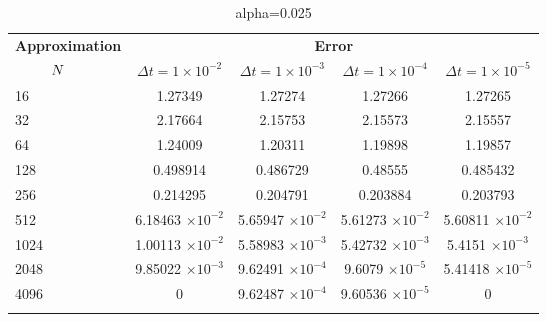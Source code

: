 	\begin{table}
		\begin{tabular}{lcccc}
			\toprule
			\multicolumn{1}{c}{\textbf{Approximation}} & \multicolumn{4}{c}{\textbf{Error}} \\
			$\hspace{9mm}N$ & $\Delta t=1\times 10^{-2}$ & $\Delta t=1\times 10^{-3}$ & $\Delta t=1\times 10^{-4}$ & $\Delta t=1\times 10^{-5}$ \\
			\midrule
			\hspace{7mm} 16 & 1.27349    & 1.27274     & 1.27266     & 1.27265     \\
			\midrule
			\hspace{7mm} 32 & 2.17664    & 2.15753     & 2.15573     & 2.15557     \\
			\midrule
			\hspace{7mm} 64 & 1.24009    & 1.20311     & 1.19898     & 1.19857     \\
			\midrule
			\hspace{7mm} 128 & 0.498914   & 0.486729    & 0.48555     & 0.485432    \\
			\midrule
			\hspace{7mm} 256 & 0.214295   & 0.204791    & 0.203884    & 0.203793    \\
			\midrule
			\hspace{7mm} 512 & 6.18463 $\times 10^{-2}$  & 5.65947 $\times 10^{-2}$   & 5.61273 $\times 10^{-2}$   & 5.60811 $\times 10^{-2}$   \\
			\midrule
			\hspace{7mm} 1024 & 1.00113 $\times 10^{-2}$  & 5.58983 $\times 10^{-3}$  & 5.42732 $\times 10^{-3}$  & 5.4151 $\times 10^{-3}$  \\
			\midrule
			\hspace{7mm} 2048 & 9.85022 $\times 10^{-3}$ & 9.62491 $\times 10^{-4}$ & 9.6079 $\times 10^{-5}$  & 5.41418 $\times 10^{-5}$ \\
			\midrule
			\hspace{7mm} 4096 & 0          & 9.62487 $\times 10^{-4}$ & 9.60536 $\times 10^{-5}$ & 0           \\
			\\
			\bottomrule
		\end{tabular}
		\caption{alpha=0.025}
	\end{table}
	
